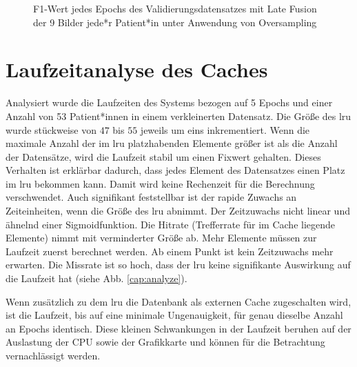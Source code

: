 \begin{figure}[b]\centering
\makebox[0pt]{}
\caption[F1-Wert jedes Epochs des Validierungsdatensatzes mit Late Fusion unter Anwendung von Oversampling]{F1-Wert jedes Epochs des Validierungsdatensatzes mit Late Fusion der 9 Bilder jede*r Patient*in unter Anwendung von Oversampling}\label{cap:f1_lf_oversampling}
\end{figure}\label{fig:f1_lf_oversampling}






















\clearpage
\section{Laufzeitanalyse des Caches}\label{analyze}
Analysiert wurde die Laufzeiten des Systems bezogen auf 5 Epochs und einer Anzahl von 53 Patient*innen in einem verkleinerten Datensatz. Die Größe des \ac{lru} wurde stückweise von $47$ bis $55$ jeweils um eins inkrementiert. Wenn die maximale Anzahl der im \ac{lru} platzhabenden Elemente größer ist als die Anzahl der Datensätze, wird die Laufzeit stabil um einen Fixwert gehalten. Dieses Verhalten ist erklärbar dadurch, dass jedes Element des Datensatzes einen Platz im \ac{lru} bekommen kann. Damit wird keine Rechenzeit für die Berechnung verschwendet. Auch signifikant feststellbar ist der rapide Zuwachs an Zeiteinheiten, wenn die Größe des \ac{lru} abnimmt. Der Zeitzuwachs nicht linear und ähnelnd einer Sigmoidfunktion. Die Hitrate (Trefferrate für im Cache liegende Elemente) nimmt mit verminderter Größe ab. Mehr Elemente müssen zur Laufzeit zuerst berechnet werden. Ab einem Punkt ist kein Zeitzuwachs mehr erwarten. Die Missrate ist so hoch, dass der \ac{lru} keine signifikante Auswirkung auf die Laufzeit hat (siehe Abb. \ref{cap:analyze}).

Wenn zusätzlich zu dem \ac{lru} die Datenbank als externen Cache zugeschalten wird, ist die Laufzeit, bis auf eine minimale Ungenauigkeit, für genau dieselbe Anzahl an Epochs identisch. Diese kleinen Schwankungen in der Laufzeit beruhen auf der Auslastung der CPU sowie der Grafikkarte und können für die Betrachtung vernachlässigt werden.

